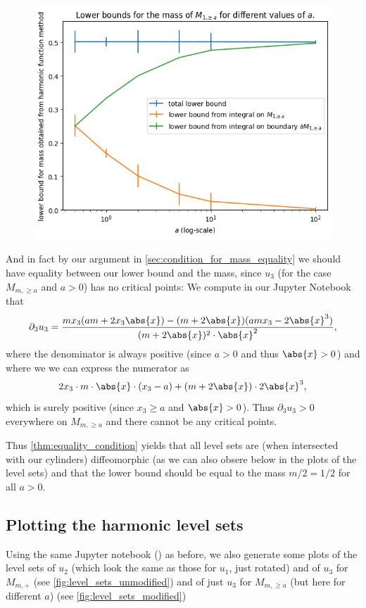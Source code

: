 \documentclass[titlepage,numbers=noenddot,oneside,%
cleardoublepage=empty,paper=a4,fontsize=11pt,%
english,%
]{scrartcl}
\begin{document}
\begin{figure}
    \centering
    \includegraphics[width=0.8\linewidth]{figures/lower_bounds_for_different_values_of_a.png}
    \caption{}
    \label{fig:lower_bounds_for_different_values_of_a}
\end{figure}

And in fact by our argument in \cref{sec:condition_for_mass_equality} we should have equality between our lower bound and the mass, since \( u_3 \) (for the case \( M_{m,\geq a} \) and \( a>0 \)) has no critical points: We compute in our Jupyter Notebook that
\begin{equation*}
    \partial_3 u_3=\frac{m x_{3}(a m + 2 x_{3} \abs{x}) -(m + 2 \abs{x}) (a m x_{3} - 2 \abs{x}^3)}{(m + 2 \abs{x})^{2} \cdot \abs{x}^2},
\end{equation*}
where the denominator is always positive (since \( a>0 \) and thus \( \abs{x}>0 \)) and where we we can express the numerator as
\begin{equation*}
    2x_3\cdot m\cdot \abs{x}\cdot (x_3-a)+(m+2\abs{x})\cdot 2\abs{x}^3,
\end{equation*}
which is surely positive (since \( x_3\geq a \) and \( \abs{x}>0 \)). Thus \( \partial_3 u_3>0 \) everywhere on \( M_{m,\geq a} \) and there cannot be any critical points.

Thus \cref{thm:equality_condition} yields that all level sets are (when intersected with our cylinders) diffeomorphic (as we can also obsere below in the plots of the level sets) and that the lower bound should be equal to the mass \( m/2=1/2 \) for all \( a>0 \).

\subsection{Plotting the harmonic level sets}
Using the same Jupyter notebook (\cite{fischerhenryrubenHarmonicFunctionMethod2023}) as before, we also generate some plots of the level sets of \( u_2 \) (which look the same as those for \( u_1 \), just rotated) and of \( u_3 \) for \( M_{m,+} \) (see \cref{fig:level_sets_unmodified}) and of just \( u_3 \) for \( M_{m,\geq a} \) (but here for different \( a \)) (see \cref{fig:level_sets_modified})
\end{document}
